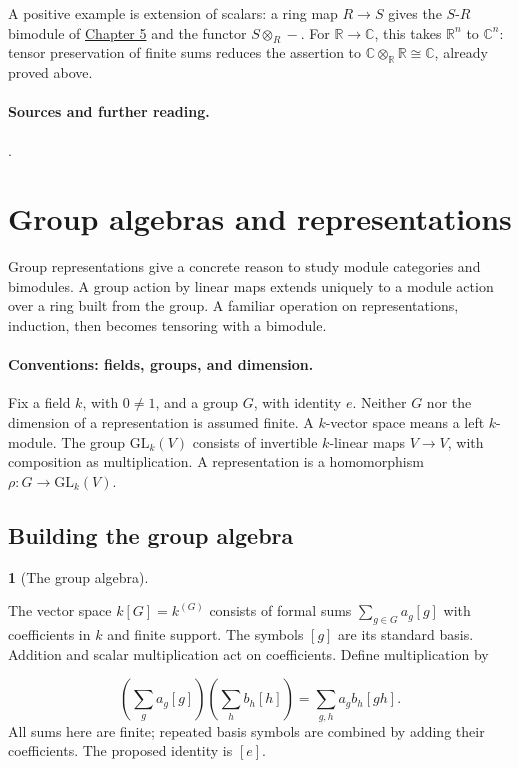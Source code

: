 \documentclass[11pt,a4paper]{article}
\newcommand{\mathheading}{}
\theoremstyle{plain}
\theoremstyle{definition}
\newtheorem*{definitionstatement}{\mathheading}
\newenvironment{mathdefinition}[3]{\renewcommand{\mathheading}{#1 #2}\begin{definitionstatement}[#3]}{\end{definitionstatement}}
\begin{document}
 
A positive example is extension of scalars: a ring map \(R\to S\) gives the \(S\)-\(R\) bimodule of \hyperref[chapter-05]{Chapter 5} and the functor \(S\otimes_R-\). For \(\mathbb R\to\mathbb C\), this takes \(\mathbb R^n\) to \(\mathbb C^n\): tensor preservation of finite sums reduces the assertion to \(\mathbb C\otimes_{\mathbb R}\mathbb R\cong\mathbb C\), already proved above.

 
\paragraph{Sources and further reading.}
\cite[\S1.11]{crawley}.

\section{Group algebras and representations}
\label{chapter-07}
  
Group representations give a concrete reason to study module categories and bimodules. A group action by linear maps extends uniquely to a module action over a ring built from the group. A familiar operation on representations, induction, then becomes tensoring with a bimodule.

 

\paragraph{Conventions: fields, groups, and dimension.}

Fix a field \(k\), with \(0\ne1\), and a group \(G\), with identity \(e\). Neither \(G\) nor the dimension of a representation is assumed finite. A \(k\)-vector space means a left \(k\)-module. The group \(\mathrm{GL}_k(V)\) consists of invertible \(k\)-linear maps \(V\to V\), with composition as multiplication. A representation is a homomorphism \(\rho:G\to\mathrm{GL}_k(V)\).


 
\subsection{Building the group algebra}
\label{algebra}
 
\begin{mathdefinition}{Definition}{7.1}{The group algebra}
\label{env-7-1}

The vector space \(k[G]=k^{(G)}\) consists of formal sums \(\sum_{g\in G}a_g[g]\) with coefficients in \(k\) and finite support. The symbols \([g]\) are its standard basis. Addition and scalar multiplication act on coefficients. Define multiplication by

 \[\left(\sum_g a_g[g]\right)\left(\sum_h b_h[h]\right)=\sum_{g,h}a_gb_h[gh].\] 
All sums here are finite; repeated basis symbols are combined by adding their coefficients. The proposed identity is \([e]\).


\par{}\par

\end{mathdefinition}
 
\end{document}
